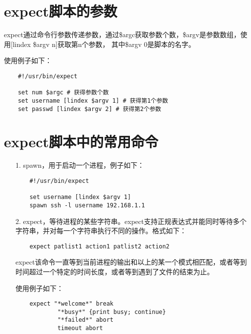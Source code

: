 \documentclass[a4paper,left=2.5cm,right=2.5cm,11pt]{article}
\begin{document}
\tableofcontents

\clearpage

\section{expect脚本的参数}
	expect通过命令行参数传递参数，通过\$argc获取参数个数，\$argv是参数数组，使用[lindex \$argv n]获取第n个参数，
	其中\$argv 0是脚本的名字。\par

	使用例子如下：
	\begin{lstlisting}
	#!/usr/bin/expect

	set num $argc # 获得参数个数
	set username [lindex $argv 1] # 获得第1个参数
	set passwd [lindex $argv 2] # 获得第2个参数
	\end{lstlisting}

\section{expect脚本中的常用命令}
	\begin{itemize}
		\item[1.] spawn，用于启动一个进程，例子如下：
		\begin{lstlisting}
	#!/usr/bin/expect

	set username [lindex $argv 1]
	spawn ssh -l username 192.168.1.1
		\end{lstlisting}

		\item[2.] expect，等待进程的某些字符串。expect支持正规表达式并能同时等待多个字符串，并对每一个字符串执行不同的操作。格式如下：
		\begin{lstlisting}
	expect patlist1 action1 patlist2 action2
		\end{lstlisting}

		expect该命令一直等到当前进程的输出和以上的某一个模式相匹配，或者等到时间超过一个特定的时间长度，或者等到遇到了文件的结束为止。\par

		使用例子如下：
		\begin{lstlisting}
	expect "*welcome*" break
			"*busy*" {print busy; continue}
			"*failed*" abort
			timeout abort
		\end{lstlisting}

	\end{itemize}
\end{document}

